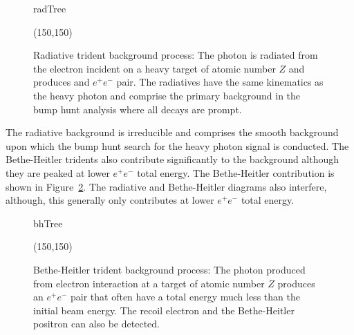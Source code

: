 \begin{figure}[htb]
    \begin{center}
	\begin{fmffile}{radTree}
	\begin{fmfgraph*}(150,150)
	\fmfstraight
		\fmffreeze
		\fmffreeze	
	\end{fmfgraph*}
	\end{fmffile}
  	\end{center}
    	\caption[Radiative background]{Radiative trident background process: The photon is radiated from the electron incident on a heavy target of atomic number $Z$ and produces and $e^+e^-$ pair. The radiatives have the same kinematics as the heavy photon and comprise the primary background in the bump hunt analysis where all decays are prompt. }
   	 \label{fig:radTree}	
\end{figure}

The radiative background is irreducible and comprises the smooth background upon which the bump hunt search for the heavy photon signal is conducted. The Bethe-Heitler tridents also contribute significantly to the background although they are peaked at lower $e^+e^-$ total energy. The Bethe-Heitler contribution is shown in Figure~\ref{fig:bhTree}. The radiative and Bethe-Heitler diagrams also interfere, although, this generally only contributes at lower $e^+e^-$ total energy. 

\begin{figure}[htb]
    \begin{center}
	\begin{fmffile}{bhTree}
	\begin{fmfgraph*}(150,150)
	\fmfstraight
		\fmffreeze
		\fmffreeze	
	\end{fmfgraph*}
	\end{fmffile}
  	\end{center}
    	\caption[Bethe-Heitler background]{Bethe-Heitler trident background process: The photon produced from electron interaction at a target of atomic number $Z$ produces an $e^+e^-$ pair that often have a total energy much less than the initial beam energy. The recoil electron and the Bethe-Heitler positron can also be detected.}
   	 \label{fig:bhTree}	
\end{figure}